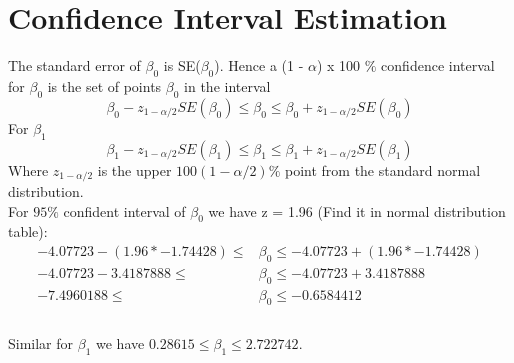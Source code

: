 \documentclass{article}
\begin{document}
    
\section {Confidence Interval Estimation}
    The standard error of $\beta_{0}$ is SE($\beta_{0}$). Hence a (1 - $\alpha$) x 100 $\%$ confidence interval for $\beta_{0}$  is the set of points $\beta_{0}$ in the interval
    \begin{equation} 
        \beta_{0} - z_{1 - \alpha/2}SE(\beta_{0}) \le \beta_{0} \le \beta_{0} + z_{1 - \alpha/2}SE(\beta_{0})
    \end{equation}
    For $\beta_{1}$
    \begin{equation} 
        \beta_{1} - z_{1 - \alpha/2}SE(\beta_{1}) \le \beta_{1} \le \beta_{1} + z_{1 - \alpha/2}SE(\beta_{1})
    \end{equation}
    Where $z_{1 - \alpha / 2}$ is the upper $100 \left(1 - \alpha / 2 \right)\%$ point from the standard normal distribution. 
    \\
    For $95\%$ confident interval of $\beta_{0}$ we have z = 1.96 (Find it in normal distribution table): 
    \begin{align} 
        -4.07723 - (1.96 * -1.74428) \le&\beta_{0}\le -4.07723 + (1.96 * -1.74428)
        \nonumber \\
        -4.07723 - 3.4187888 \le&\beta_{0}\le -4.07723 + 3.4187888
        \nonumber \\
        -7.4960188 \le&\beta_{0}\le -0.6584412 \nonumber \\
    \end{align}
    \\
    Similar for $\beta_{1}$ we have $0.28615 \le \beta_{1} \le 2.722742$.
    
\end{document}
